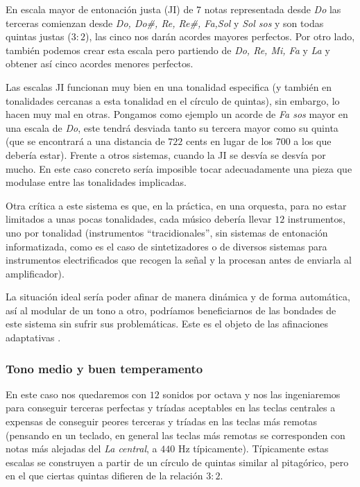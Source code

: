 \documentclass[11pt,a4paper]{article}
\begin{document}
	En escala mayor de entonación justa (JI) de 7 notas representada desde \textsl{Do} las terceras comienzan desde \textsl{Do, Do\#, Re, Re\#, Fa,Sol} y \textsl{Sol sos} y son todas quintas justas ($3:2$), las cinco nos darán acordes mayores perfectos. Por otro lado, también podemos crear esta escala pero partiendo de \textsl{Do, Re, Mi, Fa} y \textsl{La} y obtener así cinco acordes menores perfectos.
	
	Las escalas JI funcionan muy bien en una tonalidad especifica (y también en tonalidades cercanas a esta tonalidad en el círculo de quintas), sin embargo, lo hacen muy mal en otras. Pongamos como ejemplo un acorde de \textsl{Fa sos} mayor en una escala de \textsl{Do}, este tendrá desviada tanto su tercera mayor como su quinta (que se encontrará a una distancia de $722$ cents en lugar de los $700$ a los que debería estar). Frente a otros sistemas, cuando la JI se desvía se desvía por mucho. En este caso concreto sería imposible tocar adecuadamente una pieza que modulase entre las tonalidades implicadas.
	
	Otra crítica a este sistema es que, en la práctica, en una orquesta, para no estar limitados a unas pocas tonalidades, cada músico debería llevar $12$ instrumentos, uno por tonalidad (instrumentos ``tracidionales'', sin sistemas de entonación informatizada, como es el caso de  sintetizadores o de diversos sistemas para instrumentos electrificados que recogen la señal y la procesan antes de enviarla al amplificador).
 
 	La situación ideal sería poder afinar de manera dinámica y de forma automática, así al modular de un tono a otro, podríamos beneficiarnos de las bondades de este sistema sin sufrir sus problemáticas. Este es el objeto de las afinaciones adaptativas \cite{AT}. 
	
	\subsubsection{Tono medio y buen temperamento}
	
	En este caso nos quedaremos con $12$ sonidos por octava y nos las ingeniaremos para conseguir terceras perfectas y tríadas aceptables en las teclas centrales a expensas de conseguir peores terceras y tríadas en las teclas más remotas (pensando en un teclado, en general las teclas más remotas se corresponden con notas más alejadas del \textit{La central}, a $440$ Hz típicamente). Típicamente estas escalas se construyen a partir de un círculo de quintas similar al pitagórico, pero en el que ciertas quintas difieren de la relación $3:2$.
\end{document}
